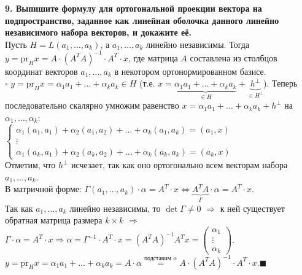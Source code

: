 \documentclass[11pt,a4paper]{article}
\newcommand{\proof}{$\square$ }
\newcommand{\qed}{\hfill$\blacksquare$}
\begin{document}
\textbf{9. Выпишите формулу для ортогональной проекции вектора на подпространство, заданное как линейная оболочка данного линейно независимого набора векторов, и докажите её.\\}
Пусть $H = L(a_1, \hdots, a_k)$, а $a_1, \hdots, a_k$ линейно независимы. Тогда $y = \mathrm{pr}_H x = A \cdot (A^T A)^{-1} \cdot A^T \cdot x$, где матрица $A$ составлена из столбцов координат векторов $a_1, \hdots, a_k$ в некотором ортонормированном базисе.\\
\proof $y = \mathrm{pr}_H x = \alpha_1 a_1 + \hdots + \alpha_k a_k \in H$ (т.е. $x = \underbrace{\alpha_1 a_1 + \hdots + \alpha_k a_k}_{\in H} + \underbrace{h^\perp}_{\in H^\perp}$). Теперь последовательно скалярно умножим равенство $x = \alpha_1 a_1 + \hdots + \alpha_k a_k + h^\perp$ на $\alpha_1, \hdots, \alpha_k$:\\
$\begin{cases}
\alpha_1 (a_1, a_1) + \alpha_2 (a_1, a_2) + \hdots + \alpha_k (a_1, a_k) = (a_1, x)\\
\vdots\\
\alpha_1 (a_k, a_1) + \alpha_2 (a_k, a_2) + \hdots + \alpha_k (a_k, a_k) = (a_k, x)
\end{cases}$\\
Отметим, что $h^\perp$ исчезает, так как оно ортогонально всем векторам набора $a_1, \hdots, a_k$.\\
В матричной форме: $\Gamma (a_1, \hdots, a_k) \cdot \alpha = A^T \cdot x \Leftrightarrow \underbrace{A^T A}_{\Gamma} \cdot \alpha = A^T \cdot x$.\\
Так как $a_1, \hdots, a_k$ линейно независимы, то $\det \Gamma \neq 0$ $\Rightarrow$ к ней существует обратная матрица размера $k \times k$ $\Rightarrow$ $\Gamma \cdot \alpha = A^T \cdot x \Rightarrow \alpha = \Gamma^{-1} \cdot A^T \cdot x = (A^T A)^{-1} A^T x = \left(\begin{matrix}\alpha_1 \\ \vdots \\ \alpha_k \end{matrix}\right)$.\\
$y = \mathrm{pr}_H x = \alpha_1 a_1 + \hdots + \alpha_k a_k = A \cdot \alpha \stackrel{\text{подставим } \alpha}{=} A \cdot (A^T A)^{-1} \cdot A^T \cdot x$.\qed
\end{document}
